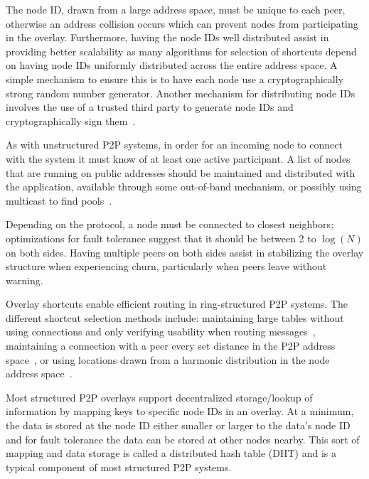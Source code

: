 \documentclass[conference]{IEEEtran}
\begin{document}
The node ID, drawn from a large address space, must be unique to each peer,
otherwise an address collision occurs which can prevent nodes from participating
in the overlay.  Furthermore, having the node IDs well distributed assist in
providing better scalability as many algorithms for selection of shortcuts
depend on having node IDs uniformly distributed across the entire address space.
A simple mechanism to ensure this is to have each node use a cryptographically
strong random number generator.  Another mechanism for distributing node IDs
involves the use of a trusted third party to generate node IDs and
cryptographically sign them~\cite{secure_routing}.

As with unstructured P2P systems, in order for an incoming node to connect with
the system it must know of at least one active participant.  A list of nodes
that are running on public addresses should be maintained and distributed with
the application, available through some out-of-band mechanism, or possibly using
multicast to find pools~\cite{pastry}.

Depending on the protocol, a node must be connected to closest
neighbors; optimizations for fault tolerance suggest
that it should be between 2 to $\log(N)$ on both sides.  
Having multiple peers on both sides assist in stabilizing the overlay structure
when experiencing churn, particularly when peers leave without warning.

Overlay shortcuts enable efficient routing in ring-structured P2P systems.  The
different shortcut selection methods include: maintaining large tables without
using connections and only verifying usability when routing
messages~\cite{pastry, kademlia}, maintaining a connection with a peer every
set distance in the P2P address space~\cite{chord}, or using locations drawn
from a harmonic distribution in the node address space~\cite{symphony}.

Most structured P2P overlays support decentralized storage/lookup of information by
mapping keys to specific node IDs in an overlay.  At a minimum, the data is stored
at the node ID either smaller or larger to the data's node ID and for fault
tolerance the data can be stored at other nodes nearby.  This sort of mapping
and data storage is called a distributed hash table (DHT) and is a typical
component of most structured P2P systems.
\end{document}
